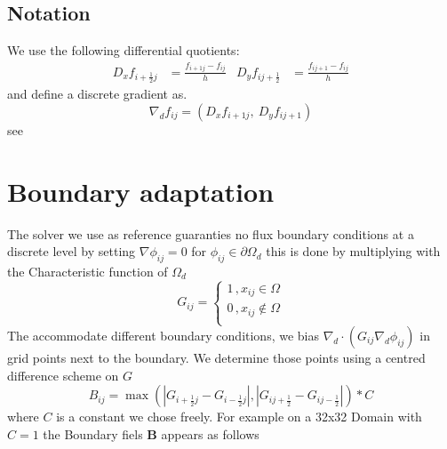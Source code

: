 \documentclass{mimosis}
\begin{document}
\section{Notation}
\label{sec:orgf31f489}
We use the following differential quotients:
\begin{align}
D_xf_{i+\frac{1}{2} j} &= \frac{f_{i+1j} - f_{ij}}{h} & D_yf_{ij+\frac{1}{2}} &= \frac{f_{ij+1} - f_{ij}}{h}
\end{align}
and define a discrete gradient as.
\begin{equation}
\nabla_d f_{ij} = (D_x f_{i+1j} , \ D_y f_{ij+1})
\end{equation}
see\autocite{Ulmer_CHRelaxed_2024}
\chapter{Boundary adaptation}
\label{sec:org4cafd7a}
The solver we use as reference guaranties no flux boundary conditions at a discrete level by setting \(\nabla \phi_{ij} = 0\) for \(\phi_{ij} \in \partial \Omega_{d}\) this is done by multiplying with the Characteristic function of \(\Omega_{d}\)
\begin{equation}
G_{ij}=
\begin{cases}
1 \,, x_{ij} \in \Omega \\
0 \,, x_{ij} \not\in \Omega \\
\end{cases}
\end{equation}
The accommodate different boundary conditions, we bias \(\nabla_d \cdot (G_{ij} \nabla_d \phi_{ij})\) in grid points next to the boundary. We determine those points using a centred difference scheme on \(G\)
\begin{equation}
B_{ij} = \max\left(  |G_{i+\frac{1}{2}j} - G_{i-\frac{1}{2}j}| , |G_{ij+\frac{1}{2}} - G_{ij-\frac{1}{2}}|\right) * C
\end{equation}
where \(C\) is a constant we chose freely. For example on a 32x32 Domain with \(C=1\) the Boundary fiels \(\mathbf{B}\) appears as follows
\end{document}
